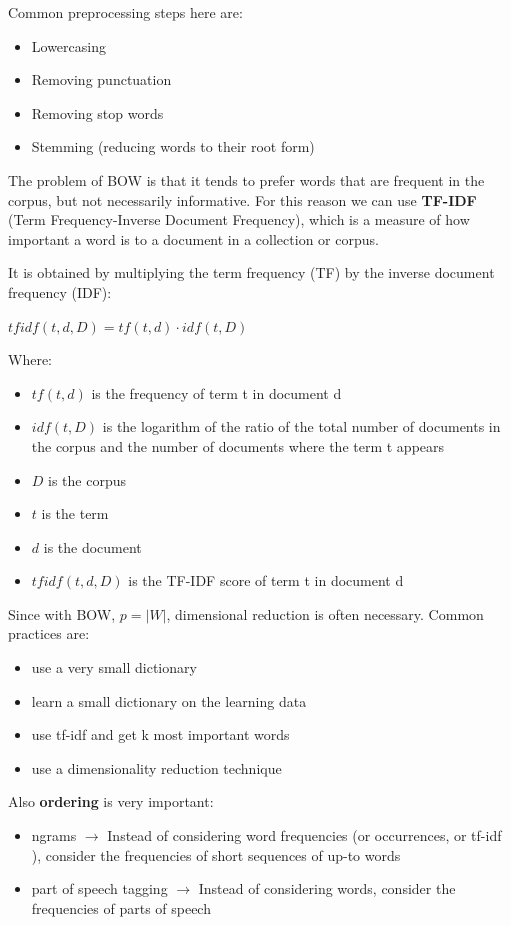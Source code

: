 Common preprocessing steps here are:
\begin{itemize}
    \item Lowercasing
    \item Removing punctuation
    \item Removing stop words
    \item Stemming (reducing words to their root form)
\end{itemize}

The problem of BOW is that it tends to prefer words that are frequent in the corpus, but not necessarily informative.
For this reason we can use \textbf{TF-IDF} (Term Frequency-Inverse Document Frequency), which is a measure of how important a word is to a document in a collection or corpus.

It is obtained by multiplying the term frequency (TF) by the inverse document frequency (IDF):
\begin{center}
    $tfidf(t, d, D) = tf(t, d) \cdot idf(t, D)$
\end{center}

Where:
\begin{itemize}
    \item $tf(t, d)$ is the frequency of term t in document d
    \item $idf(t, D)$ is the logarithm of the ratio of the total number of documents in the corpus and the number of documents where the term t appears
    \item $D$ is the corpus
    \item $t$ is the term
    \item $d$ is the document
    \item $tfidf(t, d, D)$ is the TF-IDF score of term t in document d
\end{itemize}

Since with BOW, $p = |W|$, dimensional reduction is often necessary. Common practices are:
\begin{itemize}
    \item use a very small dictionary
    \item learn a small dictionary on the learning data 
    \item use tf-idf and get k most important words
    \item use a dimensionality reduction technique
\end{itemize}

Also \textbf{ordering} is very important:
\begin{itemize}
    \item ngrams $\to$ Instead of considering word frequencies (or occurrences, or tf-idf ), consider the frequencies of short sequences of up-to words
    \item part of speech tagging $\to$ Instead of considering words, consider the frequencies of parts of speech
\end{itemize}

